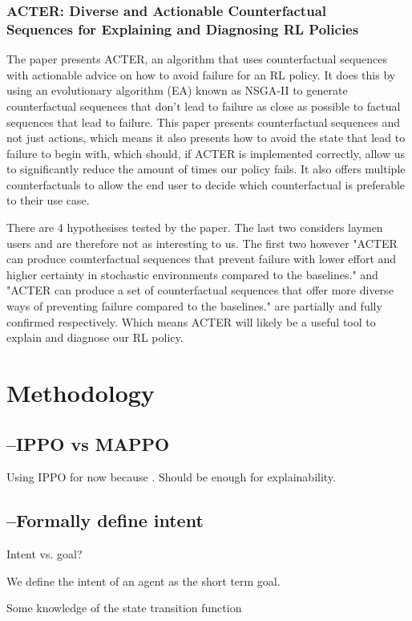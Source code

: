 \documentclass[UKenglish]{uiomasterthesis}
\begin{document}
\subsection{ ACTER: Diverse and Actionable Counterfactual\\ Sequences for Explaining and Diagnosing RL Policies}
The paper presents ACTER, an algorithm that uses counterfactual sequences with actionable advice on how to avoid failure for an RL policy. It does this by using an evolutionary algorithm (EA) known as NSGA-II to generate counterfactual sequences that don't lead to failure as close as possible to factual sequences that lead to failure. This paper presents counterfactual sequences and not just actions, which means it also presents how to avoid the state that lead to failure to begin with, which should, if ACTER is implemented correctly, allow us to significantly reduce the amount of times our policy fails. It also offers multiple counterfactuals to allow the end user to decide which counterfactual is preferable to their use case.

There are 4 hypothesises tested by the paper. The last two considers laymen users and are therefore not as interesting to us. The first two however "ACTER can produce counterfactual sequences that prevent failure with lower effort and higher certainty in stochastic environments compared to the baselines." and "ACTER can produce a set of counterfactual sequences that offer more diverse ways of preventing failure compared to the baselines." are partially and fully confirmed respectively. Which means ACTER will likely be a useful tool to explain and diagnose our RL policy.


\medskip
\chapter{Methodology}
\section{--IPPO vs MAPPO}
Using IPPO for now because \cite{dewitt2020independentlearningneedstarcraft}. Should be enough for explainability.

\section{--Formally define intent}
Intent vs. goal?

We define the intent of an agent as the short term goal.

Some knowledge of the state transition function
\end{document}
